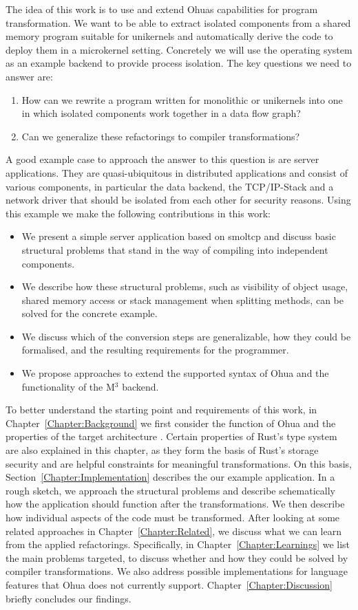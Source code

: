 The idea of this work is to use and extend Ohuas capabilities for program transformation. We want to be able to extract isolated components from a shared memory program suitable for unikernels and automatically derive the code to deploy them in a microkernel setting. Concretely we will use the \md operating system as an example backend to provide process isolation. The key questions we need to answer are:
\begin{enumerate}
    \item[] How can we rewrite a program written for monolithic or unikernels into one in which isolated components work together in a data flow graph?
    \item[] Can we generalize these refactorings to compiler transformations?
\end{enumerate}

A good example case to approach the answer to this question is are server applications. They are quasi-ubiquitous in distributed applications and consist of various components, in particular the data backend, the TCP/IP-Stack and a network driver that should be isolated from each other for security reasons. Using this example we make the following contributions in this work:

\begin{itemize}
    \item We present a simple server application based on smoltcp and discuss basic structural problems that stand in the way of compiling into independent components.
    \item We describe how these structural problems, such as visibility of object usage, shared memory access or stack management when splitting methods, can be solved for the concrete example.
    \item We discuss which of the conversion steps are generalizable, how they could be formalised, and the resulting requirements for the programmer.
    \item We propose approaches to extend the supported syntax of Ohua and the functionality of the M$^3$ backend.  
\end{itemize}


To better understand the starting point and requirements of this work, in Chapter~\ref{Chapter:Background} we first consider the function of Ohua and the properties of the target architecture \md. Certain properties of Rust's type system are also explained in this chapter, as they form the basis of Rust's storage security and are helpful constraints for meaningful transformations. On this basis, Section~\ref{Chapter:Implementation} describes the our example application. In a rough sketch, we approach the structural problems and describe schematically how the application should function after the transformations. We then describe how individual aspects of the code must be transformed. After looking at some related approaches in Chapter~\ref{Chapter:Related}, we discuss what we can learn from the applied refactorings. Specifically, in Chapter~\ref{Chapter:Learnings} we list the main problems targeted, to discuss whether and how they could be solved by compiler transformations. We also address possible implementations for language features that Ohua does not currently support. Chapter~\ref{Chapter:Discussion} briefly concludes our findings. 